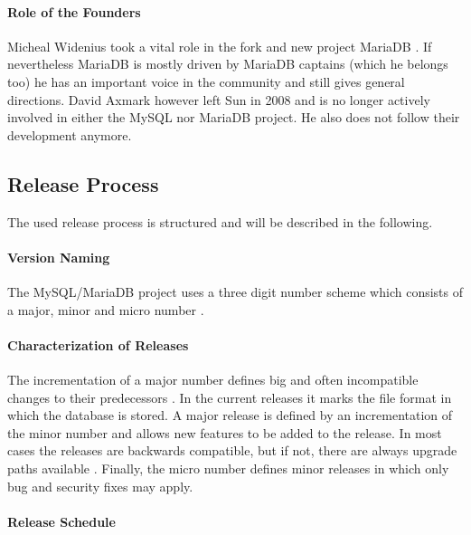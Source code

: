 \paragraph{Role of the Founders}

Micheal Widenius took a vital role in the fork and new project MariaDB
\cite{MySQLBehind,MySQLAbout}. If nevertheless MariaDB is mostly driven by
MariaDB captains (which he belongs too) he has an important voice in the
community and still gives general directions. David Axmark however left Sun in
2008 and is no longer actively involved in either the MySQL nor MariaDB
project. He also does not follow their development anymore.

\subsection{Release Process}

The used release process is structured and will be described in the following.

\paragraph{Version Naming}

The MySQL/MariaDB project uses a three digit number scheme which consists of a
major, minor and micro number \cite{MySQLVersion}.

\paragraph{Characterization of Releases}

The incrementation of a major number defines big and often incompatible changes
to their predecessors \cite{MySQLVersion}. In the current releases it marks the
file format in which the database is stored. A major release is defined by an
incrementation of the minor number and allows new features to be added to the
release. In most cases the releases are backwards compatible, but if not, there
are always upgrade paths available \cite{MySQLMariaDB5.1}. Finally, the micro
number defines minor releases in which only bug and security fixes may apply.

\paragraph{Release Schedule}

